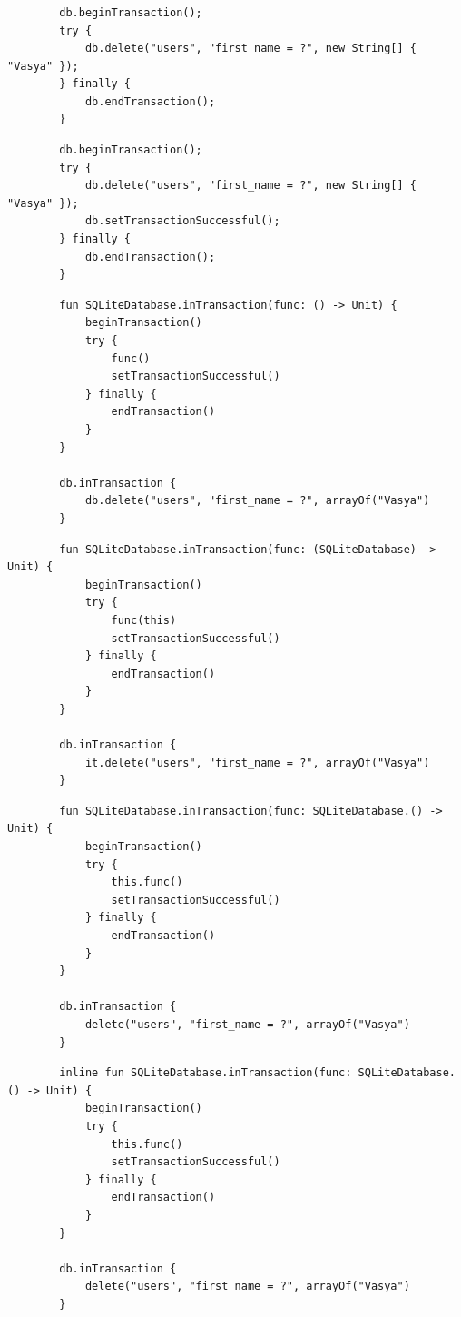 \documentclass{beamer}
\begin{document}
\begin{frame}[fragile, t]
    \frametitle{}
    \begin{verbatim}
        db.beginTransaction();
        try {
            db.delete("users", "first_name = ?", new String[] { "Vasya" });
        } finally {
            db.endTransaction();
        }
    \end{verbatim}

    \begin{verbatim}
        db.beginTransaction();
        try {
            db.delete("users", "first_name = ?", new String[] { "Vasya" });
            db.setTransactionSuccessful();
        } finally {
            db.endTransaction();
        }
    \end{verbatim}

    \begin{verbatim}
        fun SQLiteDatabase.inTransaction(func: () -> Unit) {
            beginTransaction()
            try {
                func()
                setTransactionSuccessful()
            } finally {
                endTransaction()
            }
        }

        db.inTransaction {
            db.delete("users", "first_name = ?", arrayOf("Vasya")
        }
    \end{verbatim}

    \begin{verbatim}
        fun SQLiteDatabase.inTransaction(func: (SQLiteDatabase) -> Unit) {
            beginTransaction()
            try {
                func(this)
                setTransactionSuccessful()
            } finally {
                endTransaction()
            }
        }

        db.inTransaction {
            it.delete("users", "first_name = ?", arrayOf("Vasya")
        }
    \end{verbatim}

    \begin{verbatim}
        fun SQLiteDatabase.inTransaction(func: SQLiteDatabase.() -> Unit) {
            beginTransaction()
            try {
                this.func()
                setTransactionSuccessful()
            } finally {
                endTransaction()
            }
        }

        db.inTransaction {
            delete("users", "first_name = ?", arrayOf("Vasya")
        }
    \end{verbatim}

    \begin{verbatim}
        inline fun SQLiteDatabase.inTransaction(func: SQLiteDatabase.() -> Unit) {
            beginTransaction()
            try {
                this.func()
                setTransactionSuccessful()
            } finally {
                endTransaction()
            }
        }

        db.inTransaction {
            delete("users", "first_name = ?", arrayOf("Vasya")
        }
    \end{verbatim}
\end{frame}
\end{document}
